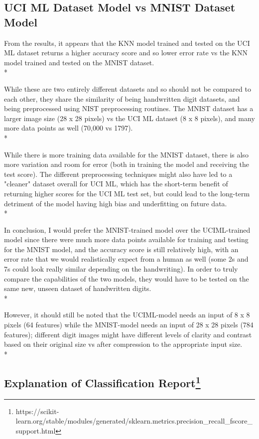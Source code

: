 \documentclass[11pt]{article}
\def\br{\hspace*{\fill} \\* }
\begin{document}
\pagebreak
    \subsection*{UCI ML Dataset Model vs MNIST Dataset Model}

From the results, it appears that the KNN model trained and tested on
the UCI ML dataset returns a higher accuracy score and so lower error
rate vs the KNN model trained and tested on the MNIST dataset.\br

While these are two entirely different datasets and so should not be
compared to each other, they share the similarity of being handwritten
digit datasets, and being preprocessed using NIST preprocessing
routines. The MNIST dataset has a larger image size (28 x 28 pixels) vs
the UCI ML dataset (8 x 8 pixels), and many more data points as well
(70,000 vs 1797).\br

While there is more training data available for the MNIST dataset, there
is also more variation and room for error (both in training the model
and receiving the test score). The different preprocessing techniques
might also have led to a "cleaner" dataset overall for UCI ML, which has
the short-term benefit of returning higher scores for the UCI ML test
set, but could lead to the long-term detriment of the model having high
bias and underfitting on future data.\br

In conclusion, I would prefer the MNIST-trained model over the
UCIML-trained model since there were much more data points available for
training and testing for the MNIST model, and the accuracy score is
still relatively high, with an error rate that we would realistically
expect from a human as well (some 2s and 7s could look really similar
depending on the handwriting). In order to truly compare the
capabilities of the two models, they would have to be tested on the same
new, unseen dataset of handwritten digits.\br

However, it should still be noted that the UCIML-model needs an input of
8 x 8 pixels (64 features) while the MNIST-model needs an input of 28 x
28 pixels (784 features); different digit images might have different
levels of clarity and contrast based on their original size vs after
compression to the appropriate input size.\br



    \subsection*{Explanation of Classification Report\footnote{https://scikit-learn.org/stable/modules/generated/sklearn.metrics.precision\_recall\_fscore\_support.html}}
\end{document}
